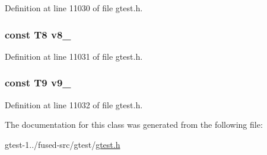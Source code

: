 \-Definition at line 11030 of file gtest.\-h.

\hypertarget{classtesting_1_1internal_1_1ValueArray15_a596bc5260b2474271d1f6910ff6f665d}{
\subsubsection[{v8\-\_\-}]{\setlength{\rightskip}{0pt plus 5cm}const \-T8 {\bf v8\-\_\-}}}\label{da/d4b/classtesting_1_1internal_1_1ValueArray15_a596bc5260b2474271d1f6910ff6f665d}


\-Definition at line 11031 of file gtest.\-h.

\hypertarget{classtesting_1_1internal_1_1ValueArray15_a6356e16cf54a9dfac8525f20242af31e}{
\subsubsection[{v9\-\_\-}]{\setlength{\rightskip}{0pt plus 5cm}const \-T9 {\bf v9\-\_\-}}}\label{da/d4b/classtesting_1_1internal_1_1ValueArray15_a6356e16cf54a9dfac8525f20242af31e}


\-Definition at line 11032 of file gtest.\-h.



\-The documentation for this class was generated from the following file\-:\begin{DoxyCompactItemize}
\item 
gtest-\/1../fused-\/src/gtest/\hyperlink{fused-src_2gtest_2gtest_8h}{gtest.\-h}\end{DoxyCompactItemize}
